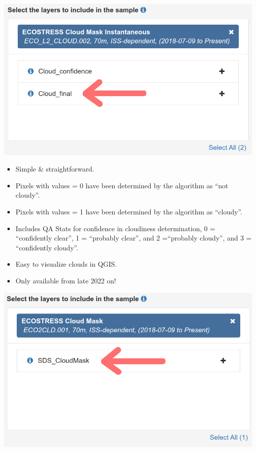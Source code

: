 \documentclass[oneside,a4paper,11pt,explicit]{book}
\begin{document}
	\begin{tcbraster}[raster columns=3, raster equal height, raster column skip=-.5mm]
		\begin{tcolorbox}[colback=yellow!5!white,colframe=IceCreamLeaf,
			colbacktitle=IceCreamLeaf,title=Cloud\_final]
			\begin{center}
				\includegraphics[width=\columnwidth]{Cloud_final.png}
			\end{center}
			\begin{itemize}[leftmargin=*]
				\item Simple \& straightforward.
				\item Pixels with values = 0 have been determined by the algorithm as ``not cloudy''.
				\item Pixels with values = 1 have been determined by the algorithm as ``cloudy''.
				\item Includes QA Stats for confidence in cloudiness determination, 0 = ``confidently clear'', 1 = ``probably clear'', and 2 =``probably cloudy'', and 3 = ``confidently cloudy''.
				\item Easy to visualize clouds in QGIS.
				\item Only available from late 2022 on!
			\end{itemize}
		\end{tcolorbox}
		\begin{tcolorbox}[colback=yellow!5!white,colframe=IceCreamLeaf, colbacktitle=IceCreamLeaf,title=SDS\_CloudMask]
			\begin{center}
				\includegraphics[width=\columnwidth]{SDS_CloudMask.png}

\end{center}
\end{tcolorbox}
\end{tcbraster}
\end{document}
